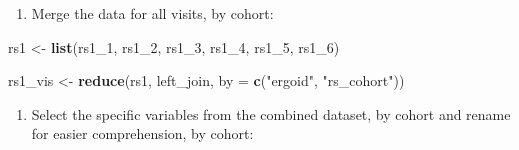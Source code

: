 \documentclass[]{book}
\newenvironment{Shaded}{\begin{snugshade}}{\end{snugshade}}
\newcommand{\CommentTok}[1]{\textcolor[rgb]{0.56,0.35,0.01}{\textit{#1}}}
\newcommand{\DataTypeTok}[1]{\textcolor[rgb]{0.13,0.29,0.53}{#1}}
\newcommand{\DecValTok}[1]{\textcolor[rgb]{0.00,0.00,0.81}{#1}}
\newcommand{\KeywordTok}[1]{\textcolor[rgb]{0.13,0.29,0.53}{\textbf{#1}}}
\newcommand{\NormalTok}[1]{#1}
\newcommand{\OperatorTok}[1]{\textcolor[rgb]{0.81,0.36,0.00}{\textbf{#1}}}
\newcommand{\StringTok}[1]{\textcolor[rgb]{0.31,0.60,0.02}{#1}}
\providecommand{\tightlist}{%
  \setlength{\itemsep}{0pt}\setlength{\parskip}{0pt}}
\begin{document}
\begin{Shaded}
\end{Shaded}

\begin{enumerate}
\def\labelenumi{\arabic{enumi}.}
\setcounter{enumi}{2}
\tightlist
\item
  Merge the data for all visits, by cohort:
\end{enumerate}

\begin{Shaded}
\begin{Highlighting}[]
\NormalTok{rs1 <-}\StringTok{ }\KeywordTok{list}\NormalTok{(rs1_}\DecValTok{1}\NormalTok{, rs1_}\DecValTok{2}\NormalTok{, rs1_}\DecValTok{3}\NormalTok{, rs1_}\DecValTok{4}\NormalTok{, rs1_}\DecValTok{5}\NormalTok{, rs1_}\DecValTok{6}\NormalTok{)}

\NormalTok{rs1_vis <-}\StringTok{ }\KeywordTok{reduce}\NormalTok{(rs1, left_join, }\DataTypeTok{by =} \KeywordTok{c}\NormalTok{(}\StringTok{"ergoid"}\NormalTok{, }\StringTok{"rs_cohort"}\NormalTok{))}
\end{Highlighting}
\end{Shaded}

\begin{enumerate}
\def\labelenumi{\arabic{enumi}.}
\setcounter{enumi}{3}
\tightlist
\item
  Select the specific variables from the combined dataset, by cohort and rename for easier comprehension, by cohort:
\end{enumerate}
\end{document}
